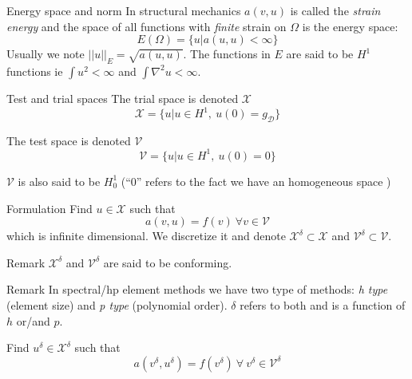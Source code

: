 \begin{frame}{Energy space and norm}
  In structural mechanics $a(v,u)$ is called the \emph{strain energy} and the space of all functions with \emph{finite} strain on $\Omega$ is the energy space:
  \begin{equation}
    \label{eq:23}
    E(\Omega) = \{u | a(u,u) < \infty \}
  \end{equation}
  Usually we note $||u||_E = \sqrt{a(u,u)}$. The functions in $E$ are
  said to be $H^1$ functions ie $\int u^2 < \infty$ and $\int \nabla^2 u <
  \infty$.
\end{frame}

\begin{frame}{Test and trial spaces}
  The trial space  is denoted $\mathcal{X}$
  \begin{equation}
    \label{eq:24}
    \mathcal{X} = \{ u | u \in H^1,\ u(0) = g_{\mathcal{D}}\}
  \end{equation}

  The test space  is denoted $\mathcal{V}$
  \begin{equation}
    \label{eq:25}
    \mathcal{V} = \{ u | u \in H^1,\ u(0) = 0 \}
  \end{equation}

  $\mathcal{V}$ is also said to be $H^1_0$ (``0'' refers to the fact we have an homogeneous space )
\end{frame}

\begin{frame}{Formulation}
  Find $u \in \mathcal{X}$ such that
  \begin{equation}
    \label{eq:26}
    a(v, u) = f(v)\ \forall v \in \mathcal{V}
  \end{equation}
  which is infinite dimensional. We  discretize it and denote
  $\mathcal{X}^{\delta} \subset \mathcal{X}$ and $\mathcal{V}^{\delta}
  \subset \mathcal{V}$.

  \begin{block}{Remark}
    $\mathcal{X}^\delta$ and $\mathcal{V}^\delta$ are said to be conforming.
  \end{block}

  \begin{block}{Remark}
  In spectral/hp element methods we have two type of methods: \emph{h
    type} (element size) and \emph{p type} (polynomial
  order). $\delta$ refers to both and is a function of $h$ or/and $p$.
  \end{block}

  Find $u^\delta \in \mathcal{X}^\delta$ such that
  \begin{equation}
    \label{eq:27}
    a(v^\delta, u^\delta) = f(v^\delta)\ \forall\ v^\delta \in \mathcal{V}^\delta
  \end{equation}
\end{frame}

